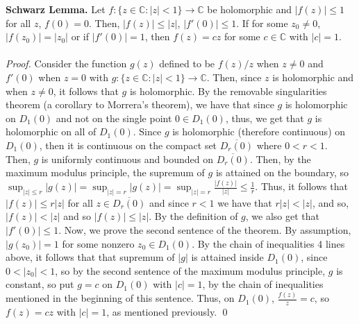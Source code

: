 \documentclass[12pt]{article}
\theoremstyle{definition}
\theoremstyle{named}
\begin{document}
\noindent
\textbf{Schwarz Lemma. } Let $f: \{z \in \mathbb{C}: |z| < 1\} \to \mathbb{C}$ be holomorphic and $|f(z)| \leq 1$ for all $z$, $f(0)=0$. Then, $|f(z)| \leq |z|$, $|f'(0)| \leq 1$. If for some $z_0 \neq 0$, $|f(z_0)| = |z_0|$ or if $|f'(0)| = 1$, then $f(z) = cz$ for some $c \in \mathbb{C}$ with $|c|=1$. 
\\ \\
\noindent
\textit{Proof. } Consider the function $g(z)$ defined to be $f(z)/z$ when $z \neq 0$ and $f'(0)$ when $z=0$ with $g: \{z \in \mathbb{C}: |z| < 1\} \to \mathbb{C}$. Then, since $z$ is holomorphic and when $z \neq 0$, it follows that $g$ is holomorphic. By the removable singularities theorem (a corollary to Morrera's theorem), we have that since $g$ is holomorphic on $D_1(0)$ and not on the single point $0 \in D_1(0)$, thus, we get that $g$ is holomorphic on all of $D_1(0)$. Since $g$ is holomorphic (therefore continuous) on $D_1(0)$, then it is continuous on the compact set $\overline{D_r(0)}$ where $0 < r < 1$. Then, $g$ is uniformly continuous and bounded on $\overline{D_r(0)}$. Then, by the maximum modulus principle, the supremum of $g$ is attained on the boundary, so $\sup_{|z| \leq r} |g(z)| = \sup_{|z|=r} |g(z)| = \sup_{|z|=r} \frac{|f(z)|}{|z|} \leq \frac{1}{r}$. Thus, it follows that $|f(z)| \leq r|z|$ for all $z \in \overline{D_r(0)}$ and since $r<1$ we have that $r|z| < |z|$, and so, $|f(z)| < |z|$ and so $|f(z)| \leq |z|$. By the definition of $g$, we also get that $|f'(0)| \leq 1$. Now, we prove the second sentence of the theorem. By assumption, $|g(z_0)|=1$ for some nonzero $z_0 \in D_1(0)$. By the chain of inequalities 4 lines above, it follows that that supremum of $|g|$ is attained inside $D_1(0)$, since $0 < |z_0| < 1$, so by the second sentence of the maximum modulus principle, $g$ is constant, so put $g=c$ on $D_1(0)$ with $|c|=1$, by the chain of inequalities mentioned in the beginning of this sentence. Thus, on $D_1(0)$, $\frac{f(z)}{z}=c$, so $f(z)=cz$ with $|c|=1$, as mentioned previously. \qed
\end{document}
